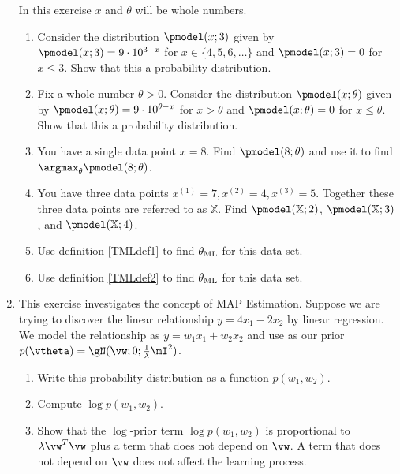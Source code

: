 \documentclass{article}
\begin{document}
\begin{enumerate}
In this exercise $x$ and $\theta$ will be whole numbers.
\begin{enumerate}
    \item Consider the distribution $\pmodel(x;3)$ given by $\pmodel(x;3) = 9\cdot10^{3-x}$ for $x \in \{4, 5, 6, \ldots\}$ and $\pmodel(x; 3) = 0$ for $x \leq 3$. Show that this a probability distribution.
    \item Fix a whole number $\theta > 0$. Consider the distribution $\pmodel(x;\theta)$ given by $\pmodel(x;\theta) = 9\cdot10^{\theta-x}$ for $x > \theta$ and $\pmodel(x; \theta) = 0$ for $x \leq \theta$. Show that this a probability distribution.
    \item You have a single data point $x = 8$. Find $\pmodel(8; \theta)$ and use it to find $\argmax_\theta \pmodel(8; \theta)$.
    \item You have three data points $x^{(1)} = 7, x^{(2)} = 4, x^{(3)} = 5$. Together these three data points are referred to as $\mathbb{X}$. Find $\pmodel(\mathbb{X}; 2)$, $\pmodel(\mathbb{X}; 3)$, and $\pmodel(\mathbb{X}; 4)$.
    \item Use definition \ref{TMLdef1} to find $\theta_\textnormal{ML}$ for this data set.
    \item Use definition \ref{TMLdef2} to find $\theta_\textnormal{ML}$ for this data set.
\end{enumerate}

\item \label{ML_ex_MAP} 
This exercise investigates the concept of MAP Estimation. Suppose we are trying to discover the linear relationship $y = 4x_1 - 2x_2$ by linear regression. We model the relationship as $y = w_1x_1 + w_2x_2$ and use as our prior $p(\vtheta) = \gN(\vw; 0; \frac{1}{\lambda}\mI^2)$. 

\begin{enumerate}
    \item Write this probability distribution as a function $p(w_1,w_2)$.
    \item Compute $\log p(w_1,w_2)$.
    \item Show that the $\log$-prior term $\log p(w_1,w_2)$ is proportional to $\lambda \vw^T\vw$ plus a term that does not depend on $\vw$. A term that does not depend on $\vw$ does not affect the learning process.
\end{enumerate}


\end{enumerate}
\end{document}
